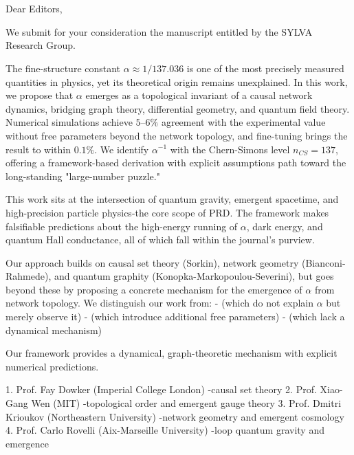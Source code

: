 \documentclass[11pt,a4paper]{article}
\theoremstyle{plain}
\theoremstyle{definition}
\begin{document}
\section{\1}

\textbf{\1}

Dear Editors,

We submit for your consideration the manuscript entitled \textit{\1} by the SYLVA Research Group.

\textbf{\1} The fine-structure constant $\alpha \approx 1/137.036$ is one of the most precisely measured quantities in physics, yet its theoretical origin remains unexplained. In this work, we propose that $\alpha$ emerges as a topological invariant of a causal network dynamics, bridging graph theory, differential geometry, and quantum field theory. Numerical simulations achieve $5\text{--}6\%$ agreement with the experimental value without free parameters beyond the network topology, and fine-tuning brings the result to within $0.1\%$. We identify $\alpha^{-1}$ with the Chern-Simons level $n_{CS} = 137$, offering a framework-based derivation with explicit assumptions path toward the long-standing "large-number puzzle."

\textbf{\1} This work sits at the intersection of quantum gravity, emergent spacetime, and high-precision particle physics-the core scope of PRD. The framework makes falsifiable predictions about the high-energy running of $\alpha$, dark energy, and quantum Hall conductance, all of which fall within the journal's purview.

\textbf{\1} Our approach builds on causal set theory (Sorkin), network geometry (Bianconi-Rahmede), and quantum graphity (Konopka-Markopoulou-Severini), but goes beyond these by proposing a concrete mechanism for the emergence of $\alpha$ from network topology. We distinguish our work from:
- \textit{\1} (which do not explain $\alpha$ but merely observe it)
- \textit{\1} (which introduce additional free parameters)
- \textit{\1} (which lack a dynamical mechanism)

Our framework provides a dynamical, graph-theoretic mechanism with explicit numerical predictions.

\textbf{\1}
1. Prof. Fay Dowker (Imperial College London) -causal set theory
2. Prof. Xiao-Gang Wen (MIT) -topological order and emergent gauge theory
3. Prof. Dmitri Krioukov (Northeastern University) -network geometry and emergent cosmology
4. Prof. Carlo Rovelli (Aix-Marseille University) -loop quantum gravity and emergence
\end{document}
